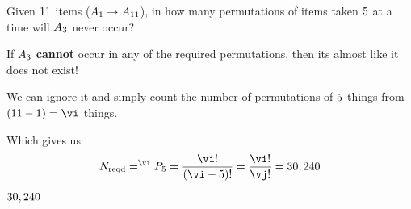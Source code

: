 



\SUBTRACT{}\vi
\SUBTRACT\vi\vm\vj

\question[3] Given $11$ items ($A_1\to A_{11}$), in how many permutations of items taken $5$ 
at a time will $A_{3}$ never occur? 

\watchout

\begin{solution}[\mcq]
  If $A_{3}$ \textbf{cannot} occur in any of the required permutations, then its almost like 
  it does not exist!

  We can ignore it and simply count the number of permutations of $5$ things from $(\vn-1) = \vi$ things.

  Which gives us 
  \[ N_{\text{reqd}} = ^{\vi}P_\vm = \dfrac{\vi!}{(\vi-\vm)!} = \dfrac{\vi !}{\vj !} = \vz\]
\end{solution}

\ifprintanswers\begin{codex}$30,240$\end{codex}\fi
